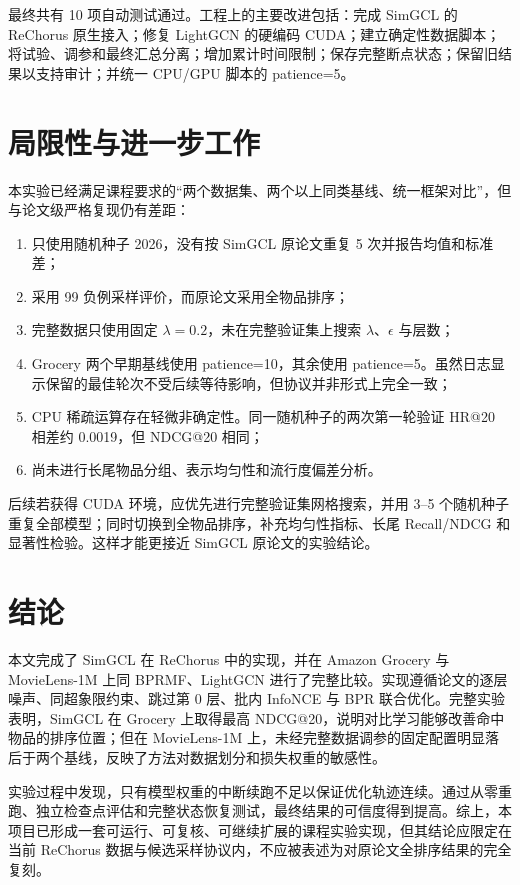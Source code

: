 \documentclass[UTF8,a4paper,12pt]{ctexart}
\begin{document}
最终共有 10 项自动测试通过。工程上的主要改进包括：完成 SimGCL 的 ReChorus 原生接入；修复 LightGCN 的硬编码 CUDA；建立确定性数据脚本；将试验、调参和最终汇总分离；增加累计时间限制；保存完整断点状态；保留旧结果以支持审计；并统一 CPU/GPU 脚本的 patience=5。

\section{局限性与进一步工作}

本实验已经满足课程要求的“两个数据集、两个以上同类基线、统一框架对比”，但与论文级严格复现仍有差距：

\begin{enumerate}
  \item 只使用随机种子 2026，没有按 SimGCL 原论文重复 5 次并报告均值和标准差；
  \item 采用 99 负例采样评价，而原论文采用全物品排序；
  \item 完整数据只使用固定 $\lambda=0.2$，未在完整验证集上搜索 $\lambda$、$\epsilon$ 与层数；
  \item Grocery 两个早期基线使用 patience=10，其余使用 patience=5。虽然日志显示保留的最佳轮次不受后续等待影响，但协议并非形式上完全一致；
  \item CPU 稀疏运算存在轻微非确定性。同一随机种子的两次第一轮验证 HR@20 相差约 0.0019，但 NDCG@20 相同；
  \item 尚未进行长尾物品分组、表示均匀性和流行度偏差分析。
\end{enumerate}

后续若获得 CUDA 环境，应优先进行完整验证集网格搜索，并用 3--5 个随机种子重复全部模型；同时切换到全物品排序，补充均匀性指标、长尾 Recall/NDCG 和显著性检验。这样才能更接近 SimGCL 原论文的实验结论。

\section{结论}

本文完成了 SimGCL 在 ReChorus 中的实现，并在 Amazon Grocery 与 MovieLens-1M 上同 BPRMF、LightGCN 进行了完整比较。实现遵循论文的逐层噪声、同超象限约束、跳过第 0 层、批内 InfoNCE 与 BPR 联合优化。完整实验表明，SimGCL 在 Grocery 上取得最高 NDCG@20，说明对比学习能够改善命中物品的排序位置；但在 MovieLens-1M 上，未经完整数据调参的固定配置明显落后于两个基线，反映了方法对数据划分和损失权重的敏感性。

实验过程中发现，只有模型权重的中断续跑不足以保证优化轨迹连续。通过从零重跑、独立检查点评估和完整状态恢复测试，最终结果的可信度得到提高。综上，本项目已形成一套可运行、可复核、可继续扩展的课程实验实现，但其结论应限定在当前 ReChorus 数据与候选采样协议内，不应被表述为对原论文全排序结果的完全复刻。
\end{document}

